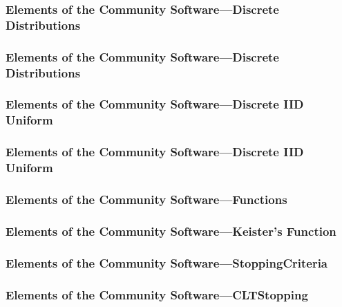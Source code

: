\documentclass[11pt,compress,xcolor={usenames,dvipsnames},aspectratio=169]{beamer}
\begin{document}
\begin{frame}[fragile]
\frametitle{Elements of the Community Software---Discrete Distributions}
\vspace{-5ex}

\end{frame}

\begin{frame}[fragile]
\frametitle{Elements of the Community Software---Discrete Distributions}
\vspace{-5ex}

\end{frame}

\begin{frame}[fragile]
\frametitle{Elements of the Community Software---Discrete IID Uniform}
\vspace{-5ex}

\end{frame}

\begin{frame}[fragile]
\frametitle{Elements of the Community Software---Discrete IID Uniform}
\vspace{-5ex}

\end{frame}

\begin{frame}[fragile]
\frametitle{Elements of the Community Software---Functions}
\vspace{-5ex}

\end{frame}

\begin{frame}[fragile]
\frametitle{Elements of the Community Software---Keister's Function}
\vspace{-5ex}

\end{frame}

\begin{frame}[fragile]
\frametitle{Elements of the Community Software---StoppingCriteria}
\vspace{-5ex}

\end{frame}

\begin{frame}[fragile]
\frametitle{Elements of the Community Software---CLTStopping}
\vspace{-5ex}

\end{frame}
\end{document}
